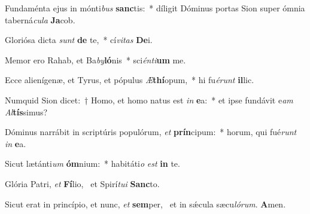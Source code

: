 \item Fundaménta ejus in mónti\textit{bus} \textbf{sanc}tis:~* díligit Dóminus portas Sion super ómnia taberná\textit{cu}\textit{la} \textbf{Ja}cob.
\item Gloriósa dicta \textit{sunt} \textbf{de} te,~* cí\textit{vi}\textit{tas} \textbf{De}i.
\item Memor ero Rahab, et Ba\textit{by}\textbf{ló}nis~* sci\textit{én}\textit{ti}\textbf{um} me.
\item Ecce alienígenæ, et Tyrus, et pópulus \textit{Æ}\textbf{thí}opum,~* hi fu\textit{é}\textit{runt} \textbf{il}lic.
\item Numquid Sion dicet:~† Homo, et homo natus est \textit{in} \textbf{e}a:~* et ipse fundávit e\textit{am} \textit{Al}\textbf{tís}simus?
\item Dóminus narrábit in scriptúris populórum, \textit{et} \textbf{prín}cipum:~* horum, qui fué\textit{runt} \textit{in} \textbf{e}a.
\item Sicut lætánti\textit{um} \textbf{óm}nium:~* habitáti\textit{o} \textit{est} \textbf{in} te.
\item Glória Patri, \textit{et} \textbf{Fí}lio,~\psstar{} et Spirí\textit{tu}\textit{i} \textbf{Sanc}to.
\item Sicut erat in princípio, et nunc, \textit{et} \textbf{sem}per,~\psstar{} et in sǽcula sæcu\textit{ló}\textit{rum}. \textbf{A}men.